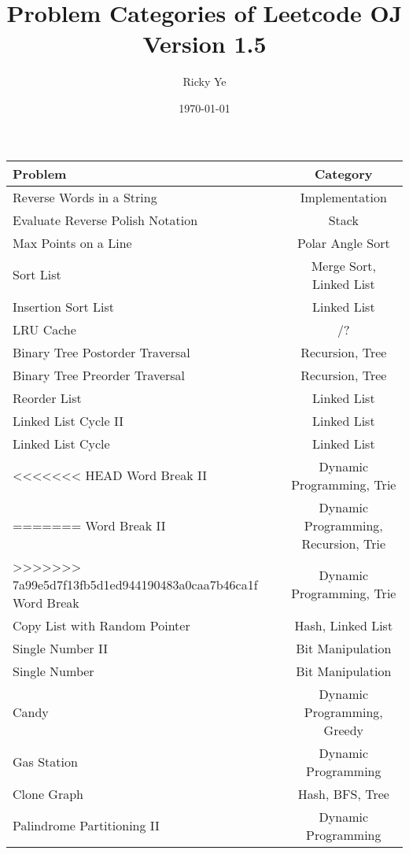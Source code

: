 \documentclass[paper=a4, fontsize=11pt]{scrartcl} %
\begin{document}
\title{Problem Categories of Leetcode OJ\\\textnormal{\small{Version 1.5}}}
\author{Ricky Ye}
\date{\today}
\maketitle

\setlength\parindent{0pt}
\small
\begin{center}
  \begin{longtable}{|l|c|}
    \hline
    \textbf{Problem}        &   \textbf{Category}    \\
    \hline
    Reverse Words in a String   &   Implementation  \\
    Evaluate Reverse Polish Notation    &   Stack   \\
    Max Points on a Line    &   Polar Angle Sort    \\
    Sort List   &   Merge Sort, Linked List \\
    Insertion Sort List &   Linked List \\
    LRU Cache   &   /?\\
    Binary Tree Postorder Traversal &   Recursion, Tree   \\
    Binary Tree Preorder Traversal  &   Recursion, Tree   \\
    Reorder List    &   Linked List \\
    Linked List Cycle II    &   Linked List \\
    Linked List Cycle   &   Linked List \\
<<<<<<< HEAD
    Word Break II   &   Dynamic Programming, Trie\\
=======
    Word Break II   &   Dynamic Programming, Recursion, Trie\\
>>>>>>> 7a99e5d7f13fb5d1ed944190483a0caa7b46ca1f
    Word Break  &   Dynamic Programming, Trie\\
    Copy List with Random Pointer   &   Hash, Linked List\\
    Single Number II    &   Bit Manipulation    \\
    Single Number   &   Bit Manipulation    \\
    Candy   &    Dynamic Programming, Greedy\\
    Gas Station &   Dynamic Programming \\
    Clone Graph &   Hash, BFS, Tree \\
    Palindrome Partitioning II  &   Dynamic Programming \\

\end{longtable}
\end{center}
\end{document}
